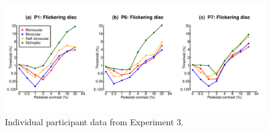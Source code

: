 \documentclass[
  letterpaper,
  DIV=11,
  numbers=noendperiod]{scrartcl}
\begin{document}
\begin{figure}

{\centering \includegraphics{Figures/individualdiscs.pdf}

}

\caption{\label{fig-individualdiscs}Individual participant data from
Experiment 3.}

\end{figure}
\end{document}
